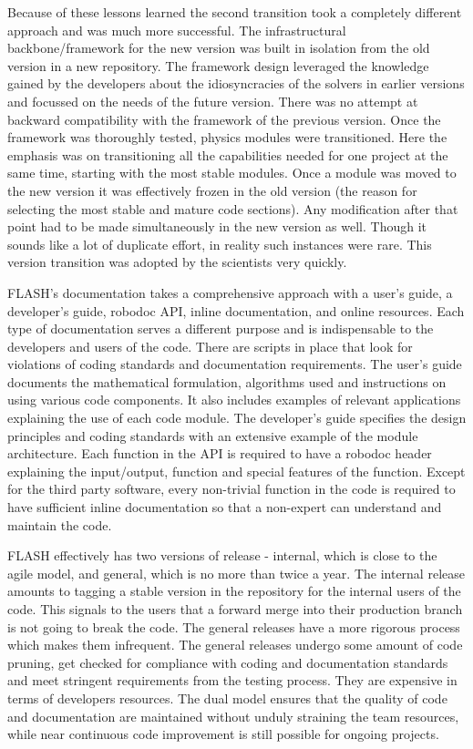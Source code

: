 Because of these lessons learned the second transition took a
completely different approach and was much more successful. The
infrastructural backbone/framework for the new version was built in
isolation from the old version in a new repository. The framework design
leveraged the knowledge gained by the developers about the
idiosyncracies of the solvers in earlier versions and focussed on
the needs of the future version. There was no attempt at backward
compatibility with the framework of the previous version. Once the
framework was thoroughly tested, physics modules were
transitioned. Here the emphasis was on transitioning all the
capabilities needed for one project at the same time, starting with
the most stable modules. Once a module was moved to the new version it
was effectively frozen in the old version (the reason for selecting
the most stable and mature code sections). Any modification after that
point had to be made simultaneously in the new version as well. Though
it sounds like a lot of duplicate effort, in reality such instances
were rare. This version transition was adopted by the scientists very quickly.


FLASH's documentation takes a comprehensive approach with a
user's guide, a developer's guide, robodoc API, inline documentation,
and online resources. Each type of documentation serves a different
purpose and is indispensable to the developers and users of the code.  
There are scripts in place that look for violations of coding
standards and documentation requirements. The user's guide documents the
mathematical formulation, algorithms used and instructions on using
various code components. It also includes examples of
relevant applications explaining the use of each code module. The
developer's guide specifies the design principles and coding standards
with an extensive example of the module architecture. Each function in
the API is required to have a robodoc header explaining the
input/output, function and special features of the function. Except
for the third party software, every non-trivial function in the code
is required to have sufficient inline documentation so that a non-expert
can understand and maintain the code.

FLASH effectively has two versions of release - internal, which
is close to the agile model, and general, which is no more than twice
a year. The internal release amounts to tagging a stable version in
the repository for the internal users of the code. This signals to
the users that a forward merge into their production branch is not
going to break the code. The general releases have a more rigorous
process which makes them infrequent. The general releases undergo some
amount of code pruning, get checked for compliance with coding and
documentation standards and meet stringent requirements from the testing
process. They are expensive in terms of developers resources. The
dual model ensures that the quality of code and documentation are
maintained without unduly straining the team resources, while
near continuous code improvement is still possible for ongoing
projects. 
 

